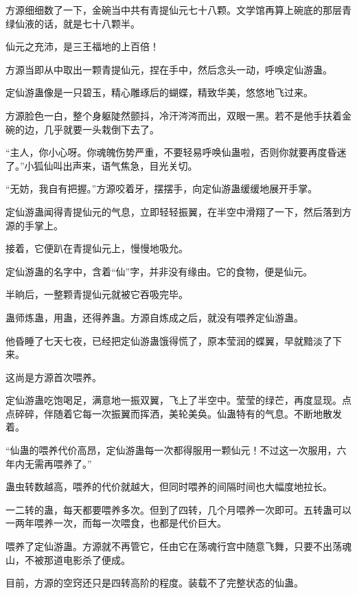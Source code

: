 
\begin{this_body}



方源细细数了一下，金碗当中共有青提仙元七十八颗。文学馆再算上碗底的那层青绿仙液的话，就是七十八颗半。

仙元之充沛，是三王福地的上百倍！

方源当即从中取出一颗青提仙元，捏在手中，然后念头一动，呼唤定仙游蛊。

定仙游蛊像是一只碧玉，精心雕琢后的蝴蝶，精致华美，悠悠地飞过来。

方源脸色一白，整个身躯陡然颤抖，冷汗涔涔而出，双眼一黑。若不是他手扶着金碗的边，几乎就要一头栽倒下去了。

“主人，你小心呀。你魂魄伤势严重，不要轻易呼唤仙蛊啦，否则你就要再度昏迷了。”小狐仙叫出声来，语气焦急，目光关切。

“无妨，我自有把握。”方源咬着牙，摆摆手，向定仙游蛊缓缓地展开手掌。

定仙游蛊闻得青提仙元的气息，立即轻轻振翼，在半空中滑翔了一下，然后落到方源的手掌上。

接着，它便趴在青提仙元上，慢慢地吸允。

定仙游蛊的名字中，含着“仙”字，并非没有缘由。它的食物，便是仙元。

半晌后，一整颗青提仙元就被它吞吸完毕。

蛊师炼蛊，用蛊，还得养蛊。方源自炼成之后，就没有喂养定仙游蛊。

他昏睡了七天七夜，已经把定仙游蛊饿得慌了，原本莹润的蝶翼，早就黯淡了下来。

这尚是方源首次喂养。

定仙游蛊吃饱喝足，满意地一振双翼，飞上了半空中。莹莹的绿芒，再度显现。点点碎碎，伴随着它每一次振翼而挥洒，美轮美奂。仙蛊特有的气息。不断地散发着。

“仙蛊的喂养代价高昂，定仙游蛊每一次都得服用一颗仙元！不过这一次服用，六年内无需再喂养了。”

蛊虫转数越高，喂养的代价就越大，但同时喂养的间隔时间也大幅度地拉长。

一二转的蛊，每天都要喂养多次。但到了四转，几个月喂养一次即可。五转蛊可以一两年喂养一次，而每一次喂食，也都是代价巨大。

喂养了定仙游蛊。方源就不再管它，任由它在荡魂行宫中随意飞舞，只要不出荡魂山，不被那道电影杀了便成。

目前，方源的空窍还只是四转高阶的程度。装载不了完整状态的仙蛊。


\end{this_body}
